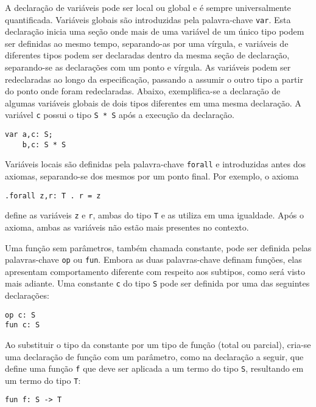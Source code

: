 A declaração de variáveis pode ser local ou global e é sempre universalmente quantificada.
Variáveis globais são introduzidas pela palavra-chave \Verb.var..
Esta declaração inicia uma seção onde mais de uma variável de um único tipo podem ser definidas ao mesmo tempo, separando-as por uma vírgula, e variáveis de diferentes tipos podem ser declaradas dentro da mesma seção de declaração, separando-se as declarações com um ponto e vírgula.
As variáveis podem ser redeclaradas ao longo da especificação, passando a assumir o outro tipo a partir do ponto onde foram redeclaradas.
Abaixo, exemplifica-se a declaração de algumas variáveis globais de dois tipos diferentes em uma mesma declaração.
A variável \Verb.c. possui o tipo \Verb.S * S. após a execução da declaração.

\begin{Verbatim}
var a,c: S;
    b,c: S * S
\end{Verbatim}

Variáveis locais são definidas pela palavra-chave \Verb.forall. e introduzidas antes dos axiomas, separando-se dos mesmos por um ponto final. Por exemplo, o axioma

\begin{Verbatim}
.forall z,r: T . r = z
\end{Verbatim}
define as variáveis \Verb.z. e \Verb.r., ambas do tipo \Verb.T. e as utiliza em uma igualdade.
Após o axioma, ambas as variáveis não estão mais presentes no contexto.

Uma função sem parâmetros, também chamada constante, pode ser definida pelas palavras-chave \Verb.op. ou \Verb.fun..
Embora as duas palavras-chave definam funções, elas apresentam comportamento diferente com respeito aos subtipos, como será visto mais adiante.
Uma constante \Verb.c. do tipo \Verb.S. pode ser definida por uma das seguintes declarações:

\begin{Verbatim}
op c: S
fun c: S
\end{Verbatim}

Ao substituir o tipo da constante por um tipo de função (total ou parcial), cria-se uma declaração de função com um parâmetro, como na declaração a seguir, que define uma função \Verb.f. que deve ser aplicada a um termo do tipo \Verb.S., resultando em um termo do tipo \Verb.T.:

\begin{Verbatim}
fun f: S -> T
\end{Verbatim}

